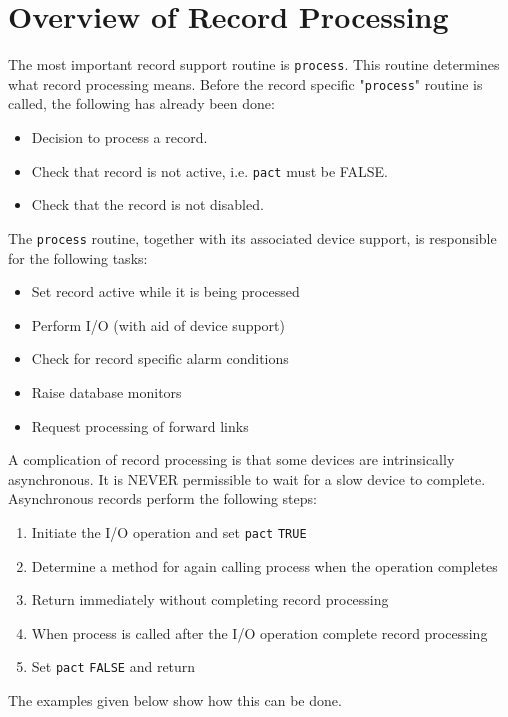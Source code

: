 \section{Overview of Record Processing}

The most important record support routine is \verb|process|. This routine determines what record processing means. Before 
the record specific "\verb|process|" routine is called, the following has already been done:

\begin{itemize}\item Decision to process a record.

\item Check that record is not active, i.e. \verb|pact| must be FALSE.

\item Check that the record is not disabled.

\end{itemize}The \verb|process| routine, together with its associated device support, is responsible for the following tasks:

\begin{itemize}\item Set record active while it is being processed

\item Perform I/O (with aid of device support)

\item Check for record specific alarm conditions

\item Raise database monitors

\item Request processing of forward links

\end{itemize}A complication of record processing is that some devices are intrinsically asynchronous. It is NEVER permissible to wait 
for a slow device to complete. Asynchronous records perform the following steps:

\begin{enumerate}\item Initiate the I/O operation and set \verb|pact| \verb|TRUE|

\item Determine a method for again calling process when the operation completes

\item Return immediately without completing record processing

\item When process is called after the I/O operation complete record processing

\item Set \verb|pact| \verb|FALSE| and return

\end{enumerate}The examples given below show how this can be done.

